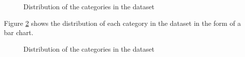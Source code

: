 \documentclass[9pt,twocolumn,twoside]{opticajnl}
\begin{document}
\begin{figure}[ht]
\centering
{}
\caption{Distribution of the categories in the dataset}
\label{fig:dist-images}
\end{figure}

Figure \ref{fig:dist-images-bar-chart} shows the distribution of each category in the dataset in the form of a bar chart.

\begin{figure}[ht]
\centering
{}
\caption{Distribution of the categories in the dataset}
\label{fig:dist-images-bar-chart}
\end{figure}
\end{document}
